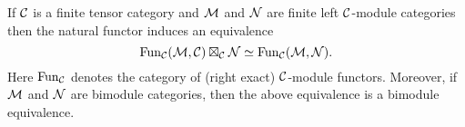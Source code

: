 \documentclass{amsart}
\begin{document}







\begin{lemma}
	If $\mathcal C$ is a finite tensor category and $\mathcal M$ and $\mathcal N$ are finite left $\mathcal C$-module categories then the natural functor induces an equivalence
	\begin{equation*}
		\operatorname{Fun}_\mathcal C(\mathcal M, \mathcal C) \boxtimes_\mathcal C \mathcal N \simeq \operatorname{Fun}_\mathcal C(\mathcal M,\mathcal N).
	\end{equation*}
	Here $\operatorname{Fun}_\mathcal C$ denotes the category of (right exact) $\mathcal C$-module functors. 
	Moreover, if $\mathcal M$ and $\mathcal N$ are bimodule categories, then the above equivalence is a bimodule equivalence. 
\end{lemma}
\end{document}
